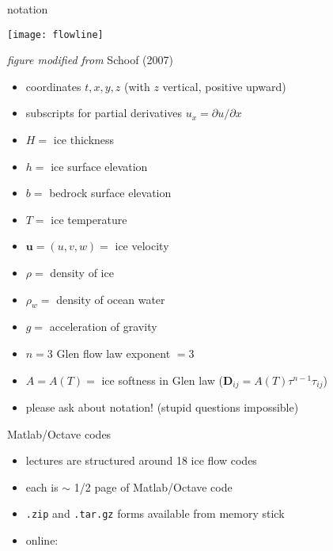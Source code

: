 \begin{frame}{notation} 

\begin{center}
  \texttt{[image: flowline]}

\tiny \emph{figure modified from} Schoof (2007)\nocite{SchoofMarine1}
\end{center}

\scriptsize
  \begin{itemize}
  \item coordinates $t,x,y,z$  (with $z$ vertical, positive upward)
  \item subscripts for partial derivatives $u_x = \partial u/\partial x$
  \item $H=$ ice thickness
  \item $h=$ ice surface elevation
  \item $b=$ bedrock surface elevation
  \item $T=$ ice temperature
  \item $\mathbf{u}=(u,v,w)=$ ice velocity
  \item $\rho=$ density of ice
  \item $\rho_w=$ density of ocean water
  \item $g=$ acceleration of gravity
  \item $n=3$ Glen flow law exponent $=3$
  \item $A=A(T)=$ ice softness in Glen law ($\mathbf{D}_{ij} = A(T) \tau^{n-1} \tau_{ij}$)
  \item \alert{please ask about notation!}  (stupid questions impossible)
  \end{itemize}

\end{frame}


\begin{frame}{Matlab/Octave codes}

\begin{itemize}
\item lectures are structured around 18 ice flow codes
\item each is $\sim$ 1/2 page of Matlab/Octave code
\item \texttt{.zip} and \texttt{.tar.gz} forms available from memory stick
\item online:

\bigskip\bigskip\small
\centerline{}
\end{itemize}
\end{frame}


